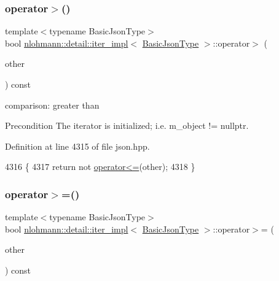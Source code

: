\subsubsection{\texorpdfstring{operator$>$()}{operator>()}}
{\footnotesize\ttfamily template$<$typename Basic\+Json\+Type$>$ \\
bool \hyperlink{classnlohmann_1_1detail_1_1iter__impl}{nlohmann\+::detail\+::iter\+\_\+impl}$<$ \hyperlink{classnlohmann_1_1detail_1_1iter__impl_abf18f18793f84b0222aebb5a2a87da7a}{Basic\+Json\+Type} $>$\+::operator$>$ (\begin{DoxyParamCaption}\item[{const \hyperlink{classnlohmann_1_1detail_1_1iter__impl}{iter\+\_\+impl}$<$ \hyperlink{classnlohmann_1_1detail_1_1iter__impl_abf18f18793f84b0222aebb5a2a87da7a}{Basic\+Json\+Type} $>$ \&}]{other }\end{DoxyParamCaption}) const\hspace{0.3cm}{\ttfamily [inline]}}



comparison\+: greater than 

\begin{DoxyPrecond}{Precondition}
The iterator is initialized; i.\+e. {\ttfamily m\+\_\+object != nullptr}. 
\end{DoxyPrecond}


Definition at line 4315 of file json.\+hpp.


\begin{DoxyCode}
4316     \{
4317         \textcolor{keywordflow}{return} not \hyperlink{classnlohmann_1_1detail_1_1iter__impl_ac6f71b36d7c87e427d1fee83f2600fad}{operator<=}(other);
4318     \}
\end{DoxyCode}
\mbox{\label{classnlohmann_1_1detail_1_1iter__impl_a634f85da575cb60b012a687efa26e11a}} 
\subsubsection{\texorpdfstring{operator$>$=()}{operator>=()}}
{\footnotesize\ttfamily template$<$typename Basic\+Json\+Type$>$ \\
bool \hyperlink{classnlohmann_1_1detail_1_1iter__impl}{nlohmann\+::detail\+::iter\+\_\+impl}$<$ \hyperlink{classnlohmann_1_1detail_1_1iter__impl_abf18f18793f84b0222aebb5a2a87da7a}{Basic\+Json\+Type} $>$\+::operator$>$= (\begin{DoxyParamCaption}\item[{const \hyperlink{classnlohmann_1_1detail_1_1iter__impl}{iter\+\_\+impl}$<$ \hyperlink{classnlohmann_1_1detail_1_1iter__impl_abf18f18793f84b0222aebb5a2a87da7a}{Basic\+Json\+Type} $>$ \&}]{other }\end{DoxyParamCaption}) const\hspace{0.3cm}{\ttfamily [inline]}}



